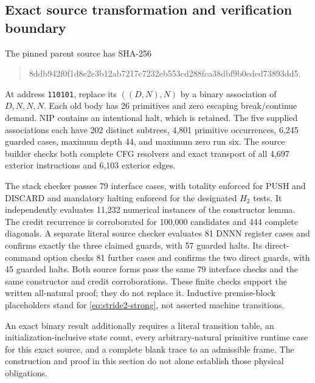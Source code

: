 \subsection{Exact source transformation and verification boundary}

The pinned parent source has SHA-256
\begin{quote}\ttfamily\small
8ddb942f0f1d8e2e3b12ab7217c7232eb553cd288fca38dbf9b0eded73893dd5.
\end{quote}
At address \texttt{110101}, replace its $((D,N),N)$ by a binary
association of $D,N,N,N$. Each old body has 26 primitives and zero
escaping break/continue demand. NIP contains an intentional halt, which
is retained. The five supplied associations each have 202 distinct
subtrees, 4,801 primitive occurrences, 6,245 guarded cases, maximum depth
44, and maximum zero run six. The source builder checks both complete
CFG resolvers and exact transport of all 4,697 exterior instructions
and 6,103 exterior edges.

The stack checker passes 79 interface cases, with totality enforced for
PUSH and DISCARD and mandatory halting enforced for the designated
$H_2$ tests. It independently evaluates 11,232 numerical instances of
the constructor lemma. The credit recurrence is corroborated for
100,000 candidates and 444 complete diagonals. A separate literal source
checker evaluates 81 DNNN register cases and confirms exactly the three
claimed guards, with 57 guarded halts. Its direct-command option checks
81 further cases and confirms the two direct guards, with 45 guarded
halts. Both source forms pass the same 79 interface checks and the same
constructor and credit corroborations. These finite checks support the written all-natural
proof; they do not replace it. Inductive premise-block placeholders
stand for \eqref{eq:stride2-strong}, not asserted machine transitions.

An exact binary result additionally requires a literal transition table,
an initialization-inclusive state count, every arbitrary-natural
primitive runtime case for this exact source, and a complete blank trace
to an admissible frame. The construction and proof in this section do
not alone establish those physical obligations.
